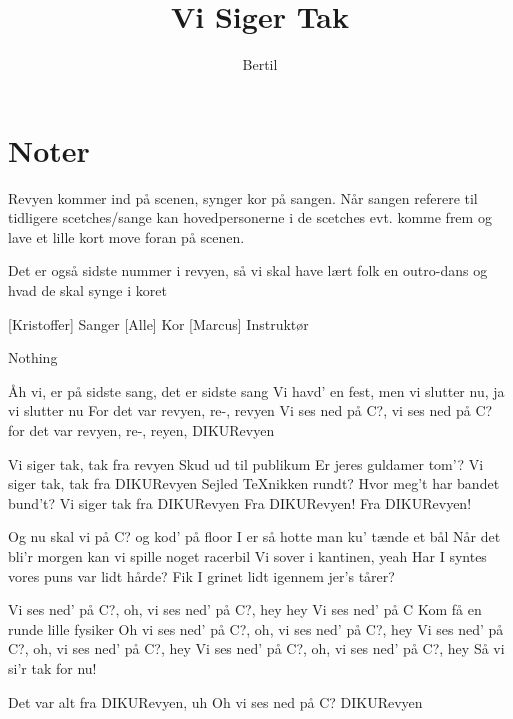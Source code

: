 \documentclass{article}
\title{Vi Siger Tak}                   %
\author{Bertil}  %
\begin{document}
                
\maketitle
\section*{Noter}                %
Revyen kommer ind på scenen, synger kor på sangen.
Når sangen referere til tidligere scetches/sange kan hovedpersonerne i de scetches evt. komme frem og lave et lille kort move foran på scenen.

Det er også sidste nummer i revyen, så vi skal have lært folk en outro-dans og hvad de skal synge i koret

\begin{roles}
[Kristoffer] Sanger
[Alle] Kor
[Marcus] Instruktør
\end{roles}

\begin{props}
     Nothing
\end{props}

\newpage%
\begin{song}
%
Åh vi, er på sidste sang, det er sidste sang
Vi havd’ en fest, men vi slutter nu, ja vi slutter nu
For det var revyen, re-, revyen
Vi ses ned på C?, vi ses ned på C? for det var
revyen, re-, reyen,
DIKURevyen

%

Vi siger tak, tak fra revyen
Skud ud til publikum
Er jeres guldamer tom’?
Vi siger tak, tak fra DIKURevyen
Sejled TeXnikken rundt?
Hvor meg’t har bandet bund’t?
Vi siger tak fra DIKURevyen
%
Fra DIKURevyen!
Fra DIKURevyen!

%
Og nu skal vi på C? og kod’ på floor
I er så hotte man ku’ tænde et bål
Når det bli’r morgen kan vi spille noget racerbil
Vi sover i kantinen, yeah
Har I syntes vores puns var lidt hårde?
Fik I grinet lidt igennem jer’s tårer?

%
Vi ses ned’ på C?, oh, vi ses ned’ på C?, hey hey
Vi ses ned’ på C
%
Kom få en runde lille fysiker
%
Oh vi ses ned’ på C?, oh, vi ses ned’ på C?, hey
Vi ses ned’ på C?, oh, vi ses ned’ på C?, hey
Vi ses ned’ på C?, oh, vi ses ned’ på C?, hey
Så vi si’r tak for nu!

%
Det var alt fra DIKURevyen, uh
%
Oh vi ses ned på C?
DIKURevyen


\end{song}
\end{document}
